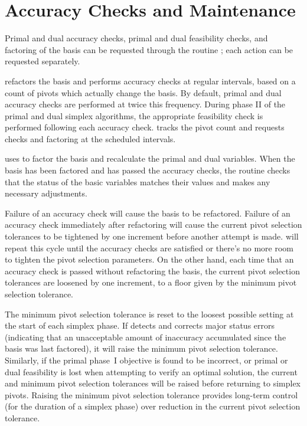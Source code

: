  
\section{Accuracy Checks and Maintenance}
\label{AccuracyChecks}

Primal and dual accuracy checks, primal and dual feasibility checks, and
factoring of the basis can be requested through the routine ;
each action can be requested separately.

\dylp refactors the basis and performs accuracy checks at regular intervals,
based on a count of pivots which actually change the basis.
By default, primal and dual accuracy checks are performed at twice this
frequency.
During phase II of the primal and dual simplex algorithms, the appropriate
feasibility check is performed following each accuracy check.
 tracks the pivot count and requests checks and factoring
at the scheduled intervals.

 uses  to factor the basis and recalculate
the primal and dual variables.
When the basis has been factored and has passed the accuracy checks, the
routine  checks that the status of the basic variables
matches their values and makes any necessary adjustments.

Failure of an accuracy check will cause the basis to be refactored.
Failure of an accuracy check immediately after refactoring will cause the
current pivot selection tolerances to be tightened by one increment before
another attempt is made.
 will repeat this cycle until the accuracy checks are
satisfied or there's no more room to tighten the pivot selection parameters.
On the other hand, each time that an accuracy check is passed without
refactoring the basis, the current pivot selection tolerances are loosened by
one increment, to a floor given by the minimum pivot selection tolerance.

The minimum pivot selection tolerance is reset to the loosest possible setting
at the start of each simplex phase.
If  detects and corrects major status errors (indicating
that an unacceptable amount of inaccuracy accumulated since the basis was
last factored), it will raise the minimum pivot selection tolerance.
Similarly, if the primal phase~I objective is found to be incorrect, or
primal or dual feasibility is lost when attempting to verify an optimal
solution, the current and minimum pivot selection tolerances will be raised
before returning to simplex pivots.
Raising the minimum pivot selection tolerance provides long-term control
(for the duration of a simplex phase) over reduction in the current pivot
selection tolerance.

